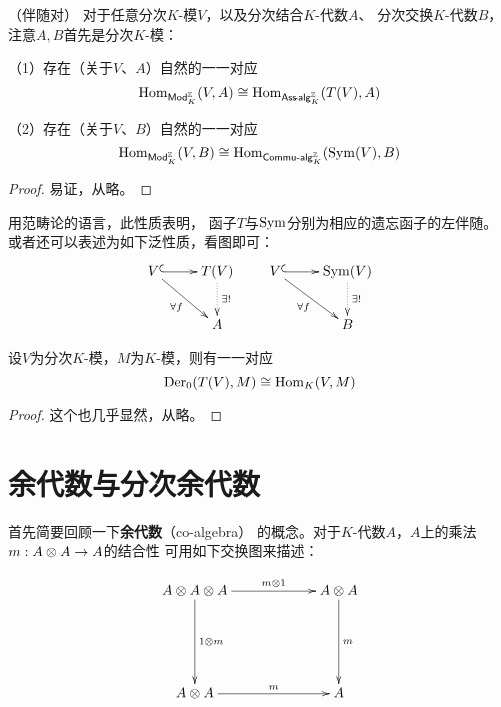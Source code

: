 \begin{prop}（伴随对）
对于任意分次$K$-模$V$，以及分次结合$K$-代数$A$、
分次交换$K$-代数$B$，注意$A,B$首先是分次$K$-模：

（1）存在（关于$V$、$A$）自然的一一对应
$$\operatorname{Hom}_{\operatorname{\mathsf{Mod}}^{\mathbb{Z}}_{K}}(V,A)\cong
\operatorname{Hom}_{\mathsf{Ass}\!\text{-}\!\operatorname{\mathsf{alg}}^{\mathbb{Z}}_{K}}(T(V),A)$$

（2）存在（关于$V$、$B$）自然的一一对应
$$\operatorname{Hom}_{\operatorname{\mathsf{Mod}}^{\mathbb{Z}}_{K}}(V,B)\cong
\operatorname{Hom}_{\operatorname{\mathsf{Commu}}\!\text{-}\!\operatorname{\mathsf{alg}}^{\mathbb{Z}}_{K}}(\operatorname{Sym}(V),B)$$
\end{prop}
\begin{proof}
易证，从略。
\end{proof}
用范畴论的语言，此性质表明，
函子$T$与$\operatorname{Sym}$分别为相应的遗忘函子的左伴随。
或者还可以表述为如下泛性质，看图即可：
$$
  \xymatrix{
      V \ar@{^{(}->}[r]  \ar[rd]_{\forall f}
    & T(V)\ar@{.>}[d]^{\exists !}
  \\
    & A
  }
\quad\quad
  \xymatrix{
      V \ar@{^{(}->}[r]  \ar[rd]_{\forall f}
    & \Sym(V)\ar@{.>}[d]^{\exists !}
  \\
    & B
  }
$$

\begin{prop}%
设$V$为分次$K$-模，$M$为$K$-模，则有一一对应
$$\operatorname{Der}_0(T(V),M)\cong\operatorname{Hom}_K(V,M)$$
\end{prop}
\begin{proof}
这个也几乎显然，从略。
\end{proof}


\section{余代数与分次余代数}
首先简要回顾一下\textbf{余代数}（co-algebra）
的概念。对于$K$-代数$A$，$A$上的乘法$m:A\otimes A\to A$的结合性
可用如下交换图来描述：

$$
  \xymatrixcolsep{5pc}
  \xymatrixrowsep{5pc}
  \xymatrix{
     A\ten A\ten A  \ar[r]^-{m\ten 1}  \ar[d]^-{1\ten m}
    &A\ten A                           \ar[d]^-m
  \\
     A\ten A        \ar[r]^-m
    &A
  }
$$

